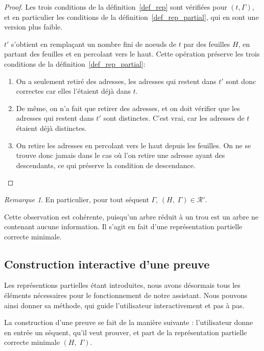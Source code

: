 \documentclass[11pt,a4paper]{article}
\theoremstyle{plain}
\theoremstyle{definition}
\theoremstyle{remark}
\newtheorem{remark}{Remarque}
\newcommand*{\sequent}{\Gamma}
\newcommand*{\representationspartial}{\ensuremath{\mathcal{R'}}}
\newcommand*{\unknown}{H}
\begin{document}
\begin{proof}
    Les trois conditions de la définition~\ref{def_rep} sont vérifiées pour $(t, \sequent)$, et en particulier les conditions de la définition~\ref{def_rep_partial}, qui en sont une version plus faible. 
    
    $t'$ s'obtient en remplaçant un nombre fini de noeuds de $t$ par des feuilles $\unknown$, en partant des feuilles et en percolant vers le haut. Cette opération préserve les trois conditions de la définition~\ref{def_rep_partial}:

    \begin{enumerate}
        \item On a seulement retiré des adresses, les adresses qui restent dans $t'$ sont donc correctes car elles l'étaient déjà dans $t$.

        \item De même, on n'a fait que retirer des adresses, et on doit vérifier que les adresses qui restent dans $t'$ sont distinctes. C'est vrai, car les adresses de $t$ étaient déjà distinctes.

        \item On retire les adresses en percolant vers le haut depuis les feuilles. On ne se trouve donc jamais dans le cas où l'on retire une adresse ayant des descendants, ce qui préserve la condition de descendance.
    \end{enumerate}
\end{proof}

\begin{remark}
    En particulier, pour tout séquent $\sequent$, $(\unknown, \; \sequent) \in \representationspartial$. 
    
    Cette observation est cohérente, puisqu'un arbre réduit à un trou est un arbre ne contenant aucune information. Il s'agit en fait d'une représentation partielle correcte minimale.
\end{remark}

\subsection{Construction interactive d'une preuve}

Les représentions partielles étant introduites, nous avons désormais tous les éléments nécessaires pour le fonctionnement de notre assistant. Nous pouvons ainsi donner sa méthode, qui guide l'utilisateur interactivement et pas à pas.

La construction d'une preuve se fait de la manière suivante : l'utilisateur donne en entrée un séquent, qu'il veut prouver, et part de la représentation partielle correcte minimale $(\unknown, \; \sequent)$. 
\end{document}
